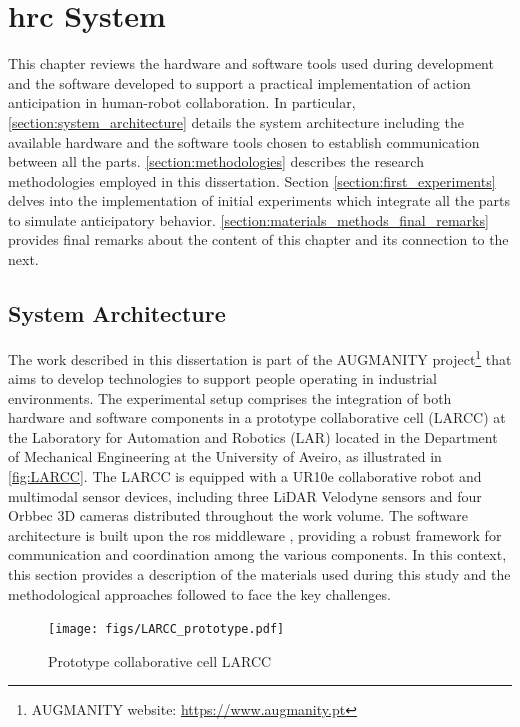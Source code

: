 \chapter{\acl{hrc} System}
\label{chapter:hrc_system}

This chapter reviews the hardware and software tools used during development and the software developed to support a practical implementation of action anticipation in human-robot collaboration. In particular, \autoref{section:system_architecture} details the system architecture including the available hardware and the software tools chosen to establish communication between all the parts. \autoref{section:methodologies} describes the research methodologies employed in this dissertation. Section \autoref{section:first_experiments} delves into the implementation of initial experiments which integrate all the parts to simulate anticipatory behavior. \autoref{section:materials_methods_final_remarks} provides final remarks about the content of this chapter and its connection to the next.

\section{System Architecture}
\label{section:system_architecture}

The work described in this dissertation is part of the AUGMANITY project\footnote{AUGMANITY website: \url{https://www.augmanity.pt}} that aims to develop technologies to support people operating in industrial environments. The experimental setup comprises the integration of both hardware and software components in a prototype collaborative cell (LARCC) at the Laboratory for Automation and Robotics (LAR) located in the Department of Mechanical Engineering at the University of Aveiro, as illustrated in \autoref{fig:LARCC}. The LARCC is equipped with a UR10e collaborative robot and multimodal sensor devices, including three LiDAR Velodyne sensors and four Orbbec 3D cameras distributed throughout the work volume. The software architecture is built upon the \acf{ros} middleware \cite{Quigley2009}, providing a robust framework for communication and coordination among the various components. In this context, this section provides a description of the materials used during this study and the methodological approaches followed to face the key challenges. 

\begin{figure}[ht]
    \centering
    \texttt{[image: figs/LARCC\_prototype.pdf]}
    \caption{Prototype collaborative cell LARCC}
    \label{fig:LARCC}
\end{figure}

